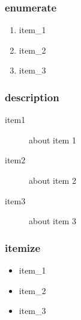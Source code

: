 \documentclass[12pt]{article}
\begin{document}
\subsubsection{enumerate}
\begin{enumerate} %
    \item item\_1
    \item item\_2
    \item item\_3
\end{enumerate}%

\subsubsection{description}
\begin{description}
    \item [item1] about item 1 
    \item [item2] about item 2 
    \item [item3] about item 3
\end{description}

\subsubsection{itemize}
\begin{itemize} 
    \item item\_1 
    \item item\_2 
    \item item\_3 
\end{itemize}
\end{document}

